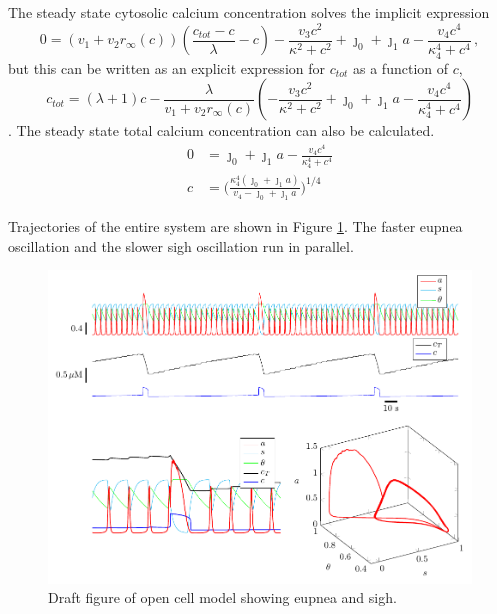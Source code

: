 \documentclass[12pt]{article}
\def\ctot{c_{tot}}
\def\rinf{r_\infty}
\def\rinf{r_\infty}
\begin{document}
The steady state cytosolic calcium concentration solves the implicit expression 
\begin{equation*}
0= (v_1 + v_2 \rinf (c) ) \left(\frac{\ctot-c}{\lambda} - c \right) - \frac{v_3 c^2 }{\kappa^2 + c^2} + \jmath_0 + \jmath_1 a -   \frac{v_4 c^4}{\kappa_4^4+c^4}  \, , 
\end{equation*}
but this can be written as an explicit expression for $\ctot$ as a function of $c$,
\begin{equation*}
\ctot = (\lambda+1 )  c  -  \frac{\lambda }{ v_1 + v_2 \rinf (c) } \left( - \frac{v_3 c^2 }{\kappa^2 + c^2} + \jmath_0 + \jmath_1 a -   \frac{v_4 c^4}{\kappa_4^4+c^4} \right) 
\end{equation*}.
The steady state total calcium concentration can also be calculated.
\begin{align*}
    0 &= \jmath_0 + \jmath_1 a -   \frac{v_4 c^4}{\kappa_4^4+c^4} \\
    c &= \Big(\frac{\kappa_4^4(\jmath_0 + \jmath_1 a)}{v_4-\jmath_0 + \jmath_1 a}\Big)^{1/4}
\end{align*}

Trajectories of the entire system are shown in Figure \ref{EupneaAndSighRepresentative}. The faster eupnea oscillation and the slower sigh oscillation run in parallel.

\begin{figure}[h!]
\centering
\includegraphics[width=\textwidth]{Fig04EupneaAndSighRepresentative.pdf}
\caption{Draft figure of open cell model showing eupnea and sigh.}
\label{EupneaAndSighRepresentative}
\end{figure}
\end{document}
